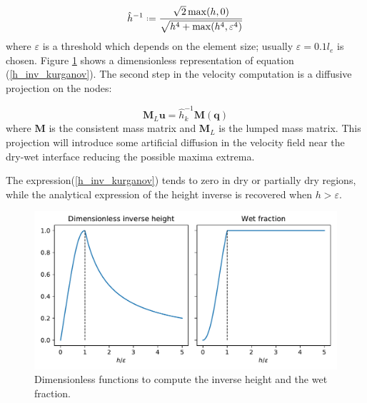\begin{equation} \label{h_inv_kurganov}
\hat{h}^{-1} \defeq \frac{\sqrt{2}\max(h,0)}{\sqrt{h^4 + \max(h^4, \varepsilon^4)}}
\end{equation}
where $\varepsilon$ is a threshold which depends on the element size; usually $\varepsilon = 0.1 l_e$ is chosen. Figure \ref{inverse_heihgt} shows a dimensionless representation of equation (\ref{h_inv_kurganov}). The second step in the velocity computation is a diffusive projection on the nodes:

\begin{equation}
\mathbf{M}_L \mathbf{u} = \hat{h}^{-1}_k \mathbf{M} (\mathbf{q})
\end{equation}
where $\mathbf{M}$ is the consistent mass matrix and $\mathbf{M}_L$ is the lumped mass matrix. This projection will introduce some artificial diffusion in the velocity field near the dry-wet interface reducing the possible maxima extrema.

The expression(\ref{h_inv_kurganov}) tends to zero in dry or partially dry regions, while the analytical expression of the height inverse is recovered when $h>\varepsilon$.

\begin{figure}
    \centering
    \includegraphics[width=\textwidth]{img/eulerian/inverse_height.pdf}
    \caption{Dimensionless functions to compute the  inverse height and the wet fraction.}
    \label{inverse_heihgt}
\end{figure}



